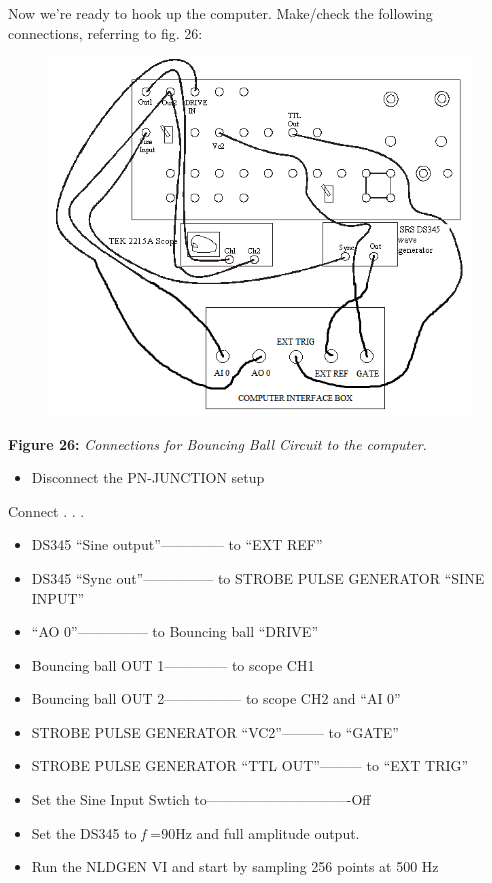 \documentclass{../lab}
\begin{document}
Now we're ready to hook up the computer. Make/check the following connections, referring to fig. 26:


\begin{figure}[h]
    \centering
    \href{http://experimentationlab.berkeley.edu/sites/default/files/images/NLD_BALL_DIAGRAM.png}{\includegraphics[width=0.5\linewidth]{images/NLD_BALL_DIAGRAM.png}}
    \caption{}
    \label{fig:NLD_BALL_DIAGRAM}
\end{figure}

\textbf{Figure 26:} \emph{Connections for Bouncing Ball Circuit to the computer.}\begin{itemize}
    \item Disconnect the PN-JUNCTION setup

\end{itemize}

Connect . . .

\begin{itemize}
    \item DS345 ``Sine output''-------------- to ``EXT REF''

    \item DS345 ``Sync out''--------------- to STROBE PULSE GENERATOR ``SINE INPUT''

    \item ``AO 0''--------------- to Bouncing ball ``DRIVE''

    \item Bouncing ball OUT 1-------------- to scope CH1

    \item Bouncing ball OUT 2----------------- to scope CH2 and ``AI 0''

    \item STROBE PULSE GENERATOR ``VC2''--------- to ``GATE''

    \item STROBE PULSE GENERATOR ``TTL OUT''--------- to ``EXT TRIG''

    \item Set the Sine Input Swtich to-------------------------------Off

    \item Set the DS345 to \emph{f} =90Hz and full amplitude output.

    \item Run the NLDGEN VI and start by sampling 256 points at 500 Hz

\end{itemize}
\end{document}
